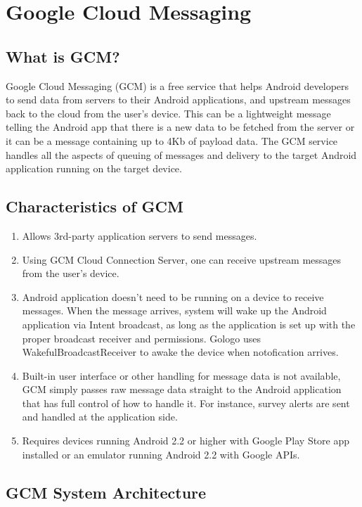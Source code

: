 \chapter {Google Cloud Messaging}
\section{What is GCM?}
\label{sec:gcmlink}
Google Cloud Messaging (GCM) is a free service that helps Android developers to send data from servers to their Android applications, and upstream messages back to the cloud from the user’s device. This can be a lightweight message telling the Android app that there is a new data to be fetched from the server or it can be a message containing up to 4Kb of payload data. The GCM service handles all the aspects of queuing of messages and delivery to the target Android application running on the target device.

\section{Characteristics of GCM}
\begin {enumerate}

\item    Allows 3rd-party application servers to send messages.
\item  Using GCM Cloud Connection Server, one can receive upstream messages from the user’s device.
\item Android application doesn’t need to be running on a device to receive messages. When the message arrives, system will wake up the Android application via Intent broadcast, as long as the application is set up with the proper broadcast receiver and permissions. Gologo uses WakefulBroadcastReceiver to awake the device when notofication arrives.
\item Built-in user interface or other handling for message data is not available, GCM simply passes raw message data straight to the Android application that has full control of how to handle it. For instance, survey alerts are sent and handled at the application side.
\item Requires devices running Android 2.2 or higher with Google Play Store app installed or an emulator running Android 2.2 with Google APIs.

\end {enumerate}

\section{GCM System Architecture}

